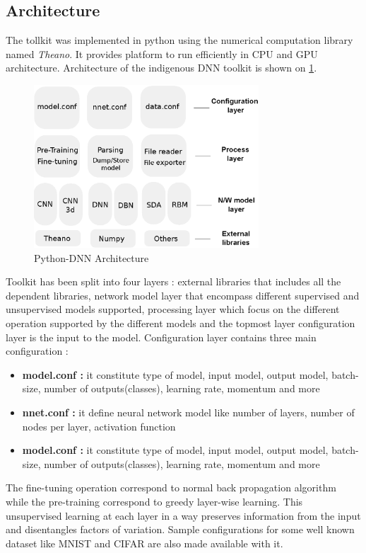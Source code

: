 \subsection{Architecture}
The tollkit was implemented in python using the numerical computation library named  \textit{Theano}. It provides platform to run efficiently in CPU and GPU architecture.
Architecture of the indigenous DNN toolkit is shown on \ref{fig:architecture}.
\begin{figure}[htpb]
   \begin{center}
	    \includegraphics[width=0.75\textwidth]{snaps/architecture.eps}     
     \caption {Python-DNN Architecture}
	 \label{fig:architecture}
   \end{center}
 \end{figure}
 Toolkit has been split into four layers : external libraries that includes all the dependent libraries, network model layer that encompass different supervised and unsupervised models supported,  processing layer which focus on the different operation supported by the different models and  the topmost layer configuration layer is the input to the model. Configuration layer contains three main configuration : 
 \begin{itemize}
	\item {\textbf{model.conf :} it constitute type of model, input model, output model, batch-size, number of outputs(classes), learning rate, momentum and more}
	\item {\textbf{nnet.conf :} it define neural network model like number of layers, number of nodes per layer, activation function}
	\item {\textbf{model.conf :} it constitute type of model, input model, output model, batch-size, number of outputs(classes), learning rate, momentum and more}
 \end{itemize}
The fine-tuning operation  correspond to normal back propagation algorithm while the pre-training correspond to greedy layer-wise learning. This unsupervised learning at each layer in a way preserves information from the input and disentangles factors of variation. Sample configurations for some well known dataset like MNIST and CIFAR are also made available with it.
